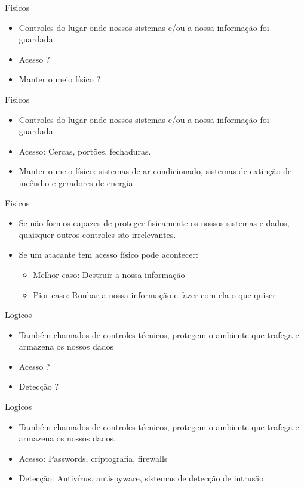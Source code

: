 \documentclass{beamer}
\begin{document}
\begin{frame}{Fisicos}
\begin{itemize}
\item Controles do lugar onde nossos sistemas e/ou a nossa informação foi guardada.
\item Acesso ?
\item Manter o meio físico ?
\end{itemize}
\end{frame}

\begin{frame}{Fisicos}
\begin{itemize}
\item Controles do lugar onde nossos sistemas e/ou a nossa informação foi guardada.
\item Acesso: Cercas, portões, fechaduras.
\item Manter o meio físico: sistemas de ar condicionado, sistemas de extinção de incêndio e geradores de energia.
\end{itemize}
\end{frame}

\begin{frame}{Fisicos}
\begin{itemize}
\item Se não formos capazes de proteger fisicamente os nossos sistemas e dados, quaisquer outros controles são irrelevantes.
\item Se um atacante tem acesso físico pode acontecer:
\begin{itemize}
\item Melhor caso: Destruir a nossa informação
\item Pior caso: Roubar a nossa informação e fazer com ela o que quiser
\end{itemize}
\end{itemize}
\end{frame}

\begin{frame}{Logicos}
\begin{itemize}
\item Também chamados de controles técnicos, protegem o ambiente que trafega e armazena os nossos dados
\item Acesso ?
\item Detecção ?
\end{itemize}
\end{frame}

\begin{frame}{Logicos}
\begin{itemize}
\item Também chamados de controles técnicos, protegem o ambiente que trafega e armazena os nossos dados.
\item Acesso: Passwords, criptografia, firewalls
\item Detecção: Antivírus, antispyware, sistemas de detecção de intrusão 
\end{itemize}
\end{frame}
\end{document}
